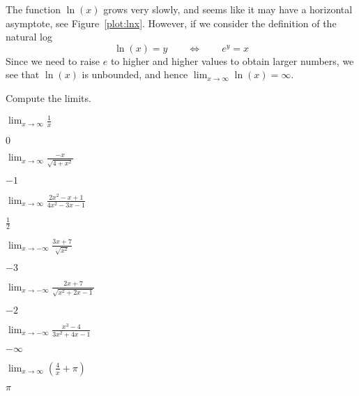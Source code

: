 \begin{solution}
The function $\ln(x)$ grows very slowly, and seems like it may have a
horizontal asymptote, see Figure~\ref{plot:lnx}. However, if we
consider the definition of the natural log
\[
\ln(x) = y \qquad \Leftrightarrow\qquad e^y =x
\]
Since we need to raise $e$ to higher and higher values to obtain
larger numbers, we see that $\ln(x)$ is unbounded, and hence
$\lim_{x\to\infty}\ln(x)=\infty$.
\end{solution}


\begin{exercises}

\noindent Compute the limits.
\twocol
\begin{exercise}
$\lim_{x\to \infty} \frac{1}{x}$
\begin{answer}
$0$
\end{answer}
\end{exercise}

\begin{exercise}
$\lim_{x\to \infty} \frac{-x}{\sqrt{4+x^2}}$
\begin{answer}
$-1$
\end{answer}
\end{exercise}

\begin{exercise}
$\lim_{x\to \infty} \frac{2x^2-x+1}{4x^2-3x-1}$
\begin{answer}
$\frac{1}{2}$
\end{answer}
\end{exercise}

\begin{exercise}
$\lim_{x\to -\infty} \frac{3x+7}{\sqrt{x^2}}$
\begin{answer}
$-3$
\end{answer}
\end{exercise}

\begin{exercise}
$\lim_{x\to -\infty} \frac{2x+7}{\sqrt{x^2+2x-1}}$
\begin{answer}
$-2$
\end{answer}
\end{exercise}

\begin{exercise}
$\lim_{x\to -\infty} \frac{x^3-4}{3x^2+4x-1}$
\begin{answer}
$-\infty$
\end{answer}
\end{exercise}


\begin{exercise}
$\lim_{x\to \infty} \left(\frac{4}{x}+\pi\right)$
\begin{answer}
$\pi$
\end{answer}
\end{exercise}


\end{exercises}
